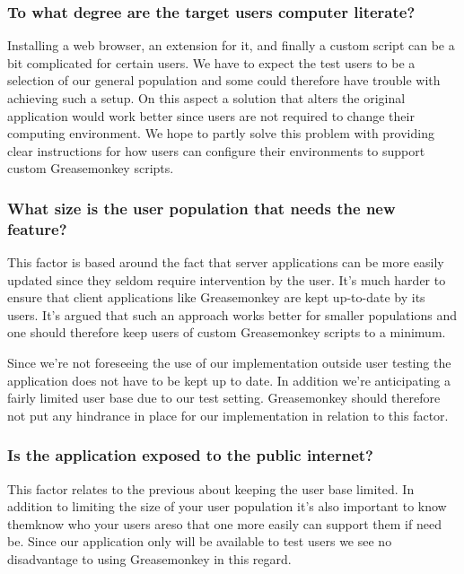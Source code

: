 \subsubsection{To what degree are the target users computer literate?}

Installing a web browser, an extension for it, and finally a custom script
can be a bit complicated for certain users. We have to expect the
test users to be a selection of our general population and some could
therefore have trouble with achieving such a setup. On this aspect
a solution that alters the original application would work better
since users are not required to change their computing environment.
We hope to partly solve this problem with providing clear instructions
for how users can configure their environments to support custom
Greasemonkey scripts.

\subsubsection{What size is the user population that needs the new feature?}

This factor is based around the fact that server applications can be more
easily updated since they seldom require intervention by the user. It's
much harder to ensure that client applications like Greasemonkey are
kept up-to-date by its users. It's argued that such an approach works
better for smaller populations and one should therefore keep users
of custom Greasemonkey scripts to a minimum.

Since we're not foreseeing the use of our implementation outside user
testing the application does not have to be kept up to date. In addition
we're anticipating a fairly limited user base due to our test setting.
Greasemonkey should therefore not put any hindrance in place for
our implementation in relation to this factor.

\subsubsection{Is the application exposed to the public internet?}

This factor relates to the previous about keeping the user base limited.
In addition to limiting the size of your user population it's also
important to know them\dash{}know who your users are\dash{}so that
one more easily can support them if need be. Since our application
only will be available to test users we see no disadvantage to
using Greasemonkey in this regard.

